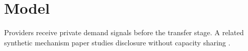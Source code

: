 \section{Model}
Providers receive private demand signals before the transfer stage. A related
synthetic mechanism paper studies disclosure without capacity sharing
\textcite{synthetic-signals}.
